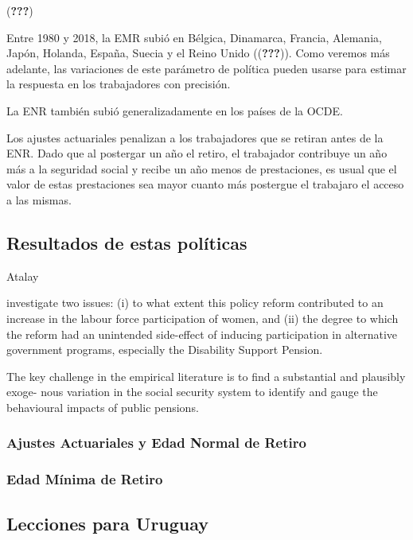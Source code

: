 \documentclass[]{article}
\begin{document}
({\textbf{???}})

Entre 1980 y 2018, la EMR subió en Bélgica, Dinamarca, Francia,
Alemania, Japón, Holanda, España, Suecia y el Reino Unido
(({\textbf{???}})). Como veremos más adelante, las variaciones de este
parámetro de política pueden usarse para estimar la respuesta en los
trabajadores con precisión.

La ENR también subió generalizadamente en los países de la OCDE.

Los ajustes actuariales penalizan a los trabajadores que se retiran
antes de la ENR. Dado que al postergar un año el retiro, el trabajador
contribuye un año más a la seguridad social y recibe un año menos de
prestaciones, es usual que el valor de estas prestaciones sea mayor
cuanto más postergue el trabajaro el acceso a las mismas.

\hypertarget{resultados-de-estas-poluxedticas}{%
\subsection{Resultados de estas
políticas}\label{resultados-de-estas-poluxedticas}}

Atalay

investigate two issues: (i) to what extent this policy reform
contributed to an increase in the labour force participation of women,
and (ii) the degree to which the reform had an unintended side-effect of
inducing participation in alternative government programs, especially
the Disability Support Pension.

The key challenge in the empirical literature is to find a substantial
and plausibly exoge- nous variation in the social security system to
identify and gauge the behavioural impacts of public pensions.

\hypertarget{ajustes-actuariales-y-edad-normal-de-retiro}{%
\subsubsection{Ajustes Actuariales y Edad Normal de
Retiro}\label{ajustes-actuariales-y-edad-normal-de-retiro}}

\hypertarget{edad-muxednima-de-retiro}{%
\subsubsection{Edad Mínima de Retiro}\label{edad-muxednima-de-retiro}}

\hypertarget{lecciones-para-uruguay}{%
\subsection{Lecciones para Uruguay}\label{lecciones-para-uruguay}}
\end{document}
